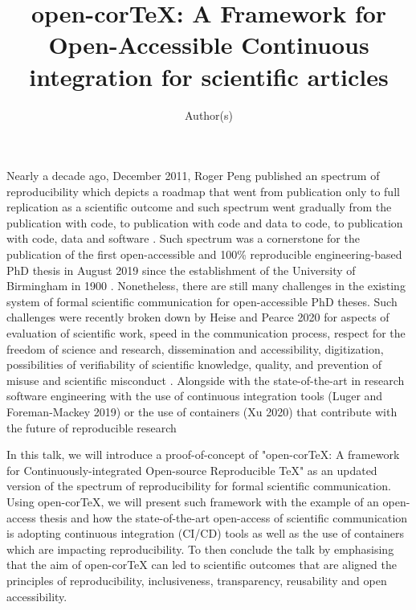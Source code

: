 \documentclass[11pt]{article}
\title{
open-corTeX: A Framework for Open-Accessible Continuous integration for scientific articles
}
\author{Author(s)}
\date{\DTMNow}
\begin{document}
\maketitle
Nearly a decade ago, December 2011, Roger Peng published an spectrum of reproducibility 
which depicts a roadmap that went from publication only to full replication as a scientific outcome
and such spectrum went gradually from the publication with code, to publication with code and data to code, 
to publication with code, data and software 
\cite{peng2011}.
Such spectrum was a cornerstone for 
the publication of the first open-accessible 
and 100\% reproducible engineering-based PhD thesis in August 2019 
since the establishment of the 
University of Birmingham in 1900 
\cite{xochicale2019-github}.
Nonetheless, there are still many challenges in the existing system 
of formal scientific communication for open-accessible PhD theses.
Such challenges were recently broken down 
by Heise and Pearce 2020
for aspects of evaluation of scientific work, 
speed in the communication process,
respect for the freedom of science and research,
dissemination and accessibility, digitization,
possibilities of verifiability of scientific knowledge, quality, 
and prevention of misuse and scientific misconduct 
\cite{heise2020}.
Alongside with the state-of-the-art in research software engineering
with the use of continuous integration tools (Luger and Foreman-Mackey 2019) 
or the use of containers (Xu 2020)
that contribute with the future of reproducible research 

In this talk, we will introduce a proof-of-concept of 
"open-corTeX: A framework for Continuously-integrated Open-source Reproducible TeX" 
as an updated version of the spectrum 
of reproducibility for formal scientific communication.
Using open-corTeX, we will present such framework with 
the example of an open-access thesis and 
how the state-of-the-art open-access of scientific communication 
is adopting continuous integration (CI/CD) tools
as well as the use of containers which are impacting reproducibility.
To then conclude the talk by emphasising that the aim 
of open-corTeX can led to scientific outcomes that are 
aligned the principles of 
reproducibility, inclusiveness, transparency,
reusability  and open accessibility.

\printbibliography
\end{document}
